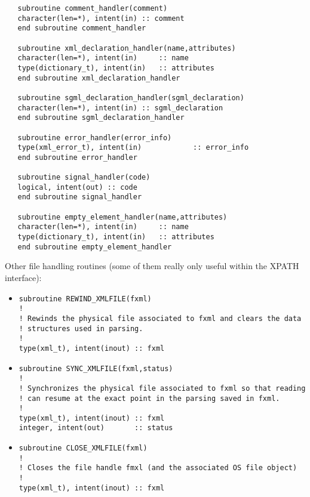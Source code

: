 \documentclass[11pt]{article}
\begin{document}
\begin{itemize}
\begin{verbatim}
   subroutine comment_handler(comment)
   character(len=*), intent(in) :: comment
   end subroutine comment_handler

   subroutine xml_declaration_handler(name,attributes)
   character(len=*), intent(in)     :: name
   type(dictionary_t), intent(in)   :: attributes
   end subroutine xml_declaration_handler

   subroutine sgml_declaration_handler(sgml_declaration)
   character(len=*), intent(in) :: sgml_declaration
   end subroutine sgml_declaration_handler

   subroutine error_handler(error_info)
   type(xml_error_t), intent(in)            :: error_info
   end subroutine error_handler

   subroutine signal_handler(code)
   logical, intent(out) :: code
   end subroutine signal_handler

   subroutine empty_element_handler(name,attributes)
   character(len=*), intent(in)     :: name
   type(dictionary_t), intent(in)   :: attributes
   end subroutine empty_element_handler
\end{verbatim}
\end{itemize}

Other file handling routines (some of them really only useful within
the XPATH interface):

\begin{itemize}
\item
\begin{verbatim}
subroutine REWIND_XMLFILE(fxml)
!
! Rewinds the physical file associated to fxml and clears the data
! structures used in parsing.
!
type(xml_t), intent(inout) :: fxml
\end{verbatim}

\item
\begin{verbatim}
subroutine SYNC_XMLFILE(fxml,status)
!
! Synchronizes the physical file associated to fxml so that reading
! can resume at the exact point in the parsing saved in fxml.
!
type(xml_t), intent(inout) :: fxml
integer, intent(out)       :: status

\end{verbatim}
\item
\begin{verbatim}
subroutine CLOSE_XMLFILE(fxml)
!
! Closes the file handle fmxl (and the associated OS file object)
!
type(xml_t), intent(inout) :: fxml
\end{verbatim}
\end{itemize}
\end{document}
